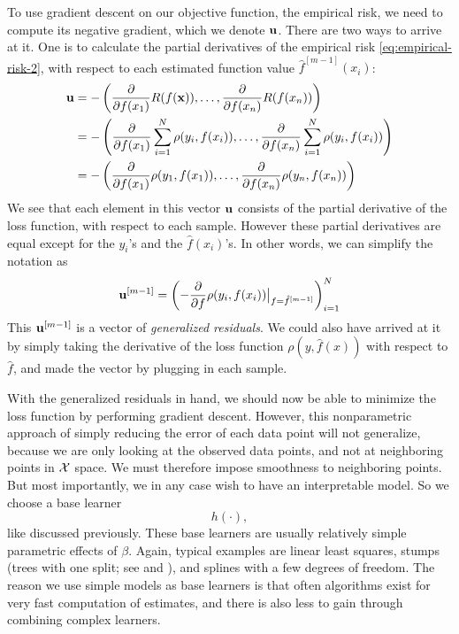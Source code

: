 To use gradient descent on our objective function, the empirical risk, we need to compute its negative gradient, which we denote $\mathbf{u}$. There are two ways to arrive at it. One is to calculate the partial derivatives of the empirical risk \eqref{eq:empirical-risk-2}, with respect to each estimated function value $\hat{f}^{[m-1]}(x_i)$:
\begin{align}
    \mathbf{u}&=-\left(\frac{\partial}{\partial f(x_1)}R(f(\mathbf{x})),\ldots,\frac{\partial}{\partial f(x_n)}R(f(x_n))\right) \\
    &=-\left(\frac{\partial}{\partial f(x_1)}\sum_{i=1}^N\rho(y_i, f(x_i)),\ldots,\frac{\partial}{\partial f(x_n)}\sum_{i=1}^N\rho(y_i, f(x_i))\right) \\
    &=-\left(\frac{\partial}{\partial f(x_1)}\rho(y_1, f(x_1)),\ldots,\frac{\partial}{\partial f(x_n)}\rho(y_n, f(x_n))\right)
\end{align}
We see that each element in this vector $\mathbf{u}$ consists of the partial derivative of the loss function, with respect to each sample. However these partial derivatives are equal except for the $y_i$'s and the $\hat{f}(x_i)$'s. In other words, we can simplify the notation as
\begin{equation}
    \mathbf{u}^{[m-1]}=\left(-\frac{\partial}{\partial f}\rho(y_i, f(x_i))\big\rvert_{f=\hat{f}^{[m-1]}}\right)_{i=1}^N
\end{equation}
This $\mathbf{u}^{[m-1]}$ is a vector of \textit{generalized residuals}. We could also have arrived at it by simply taking the derivative of the loss function $\rho(y,\hat{f}(x))$ with respect to $\hat{f}$, and made the vector by plugging in each sample.

With the generalized residuals in hand, we should now be able to minimize the loss function by performing gradient descent. However, this nonparametric approach of simply reducing the error of each data point will not generalize, because we are only looking at the observed data points, and not at neighboring points in $\mathcal{X}$ space. We must therefore impose smoothness to neighboring points. But most importantly, we in any case wish to have an interpretable model. So we choose a base learner
\begin{equation}
    h(\cdot),
\end{equation}
like discussed previously. These base learners are usually relatively simple parametric effects of $\beta$. Again, typical examples are linear least squares, stumps (trees with one split; see \citet{buhlmann2007} and \citet{ESL}), and splines with a few degrees of freedom. The reason we use simple models as base learners is that often algorithms exist for very fast computation of estimates, and there is also less to gain through combining complex learners.

